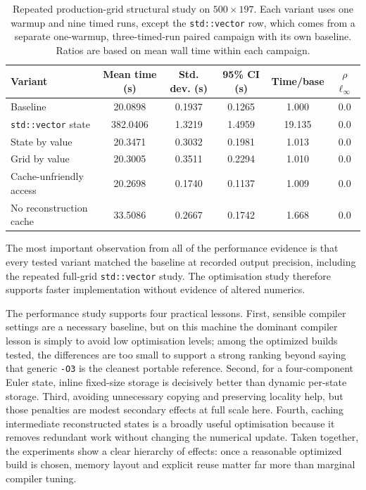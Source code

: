 \documentclass[final,3p,times,twocolumn]{elsarticle}
\begin{document}
\begin{table}[t]
\centering
\caption{Repeated production-grid structural study on $500 \times 197$. Each variant uses one warmup and nine timed runs, except the \texttt{std::vector} row, which comes from a separate one-warmup, three-timed-run paired campaign with its own baseline. Ratios are based on mean wall time within each campaign.}
\label{tab:structural_fullgrid}
\small
\setlength{\tabcolsep}{3pt}
\begin{tabular}{>{\raggedright\arraybackslash}p{2.8cm}ccccc}
\toprule
Variant & Mean time (s) & Std. dev. (s) & 95\% CI (s) & Time/base & $\rho$ $\ell_\infty$ \\
\midrule
Baseline & 20.0898 & 0.1937 & 0.1265 & 1.000 & 0.0 \\
\texttt{std::vector} state & 382.0406 & 1.3219 & 1.4959 & 19.135 & 0.0 \\
State by value & 20.3471 & 0.3032 & 0.1981 & 1.013 & 0.0 \\
Grid by value & 20.3005 & 0.3511 & 0.2294 & 1.010 & 0.0 \\
Cache-unfriendly access & 20.2698 & 0.1740 & 0.1137 & 1.009 & 0.0 \\
No reconstruction cache & 33.5086 & 0.2667 & 0.1742 & 1.668 & 0.0 \\
\bottomrule
\end{tabular}
\normalsize
\end{table}

The most important observation from all of the performance evidence is that every tested variant matched the baseline at recorded output precision, including the repeated full-grid \texttt{std::vector} study. The optimisation study therefore supports faster implementation without evidence of altered numerics.

The performance study supports four practical lessons. First, sensible compiler settings are a necessary baseline, but on this machine the dominant compiler lesson is simply to avoid low optimisation levels; among the optimized builds tested, the differences are too small to support a strong ranking beyond saying that generic \texttt{-O3} is the cleanest portable reference. Second, for a four-component Euler state, inline fixed-size storage is decisively better than dynamic per-state storage. Third, avoiding unnecessary copying and preserving locality help, but those penalties are modest secondary effects at full scale here. Fourth, caching intermediate reconstructed states is a broadly useful optimisation because it removes redundant work without changing the numerical update. Taken together, the experiments show a clear hierarchy of effects: once a reasonable optimized build is chosen, memory layout and explicit reuse matter far more than marginal compiler tuning.
\end{document}
